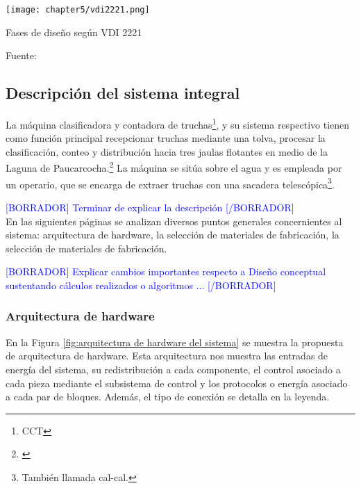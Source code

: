 \begin{myfigure}[H]
	\centering
	\texttt{[image: chapter5/vdi2221.png]}
	\caption{Fases de diseño según VDI 2221}
	\begin{myflushleftportland}
		Fuente: \cite{Pahl2007}
	\end{myflushleftportland}
	\label{fig:vdi2221}
\end{myfigure}



\subsection{Descripción del sistema integral}
\label{ssec:descripcion del sistema integral}

La máquina clasificadora y contadora de truchas\footnote{CCT}, y su sistema respectivo tienen como función principal recepcionar truchas mediante una tolva, procesar la clasificación, conteo y distribución hacia tres jaulas flotantes en medio de la Laguna de Paucarcocha.\footnote{\cite{DiazVergara2020}} La máquina se sitúa sobre el agua y es empleada por un operario, que se encarga de extraer truchas con una sacadera telescópica\footnote{También llamada cal-cal.}.

\textcolor{blue}{[BORRADOR] Terminar de explicar la descripción [/BORRADOR]}\\

En las siguientes páginas se analizan diversos puntos generales concernientes al sistema: arquitectura de hardware, la selección de materiales de fabricación, la selección de materiales de fabricación.

\textcolor{blue}{[BORRADOR] Explicar cambios importantes respecto a Diseño conceptual sustentando cálculos realizados o algoritmos ... [/BORRADOR]}\\

\subsubsection{Arquitectura de hardware}

En la Figura \ref{fig:arquitectura de hardware del sistema} se muestra la propuesta de arquitectura de hardware. Esta arquitectura nos muestra las entradas de energía del sistema, su redistribución a cada componente, el control asociado a cada pieza mediante el subsistema de control y los protocolos o energía asociado a cada par de bloques. Además, el tipo de conexión se detalla en la leyenda.

